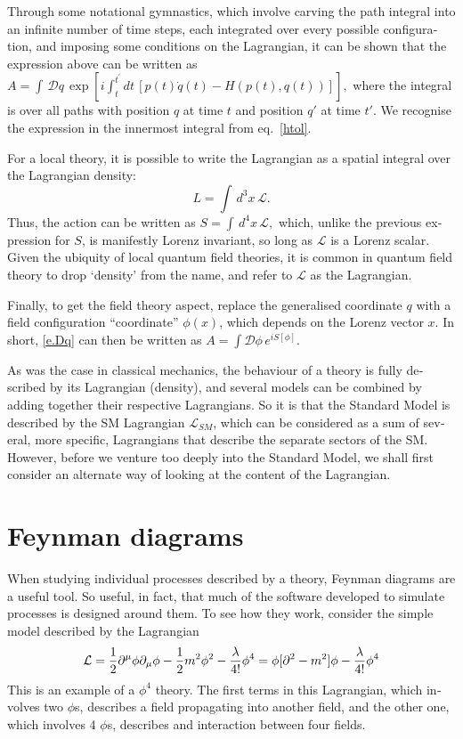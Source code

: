 \begin{english}
Through some notational gymnastics, which involve carving the path integral into an infinite number of time steps, each integrated over every possible configuration, and imposing some conditions on the Lagrangian, it can be shown \cite{sred:tramp} that the expression above can be written as
\(A=\int\,\mathcal Dq\,\exp\left[i\int_t^{t^\prime}dt\,[p(t)\dot q(t)-H(p(t),q(t))]\right],\label{e.Dq}\)
where the integral is over all paths with position $q$ at time $t$ and position $q\prime$ at time $t\prime$. We recognise the expression in the innermost integral from eq.~\eqref{htol}.

For a local theory, it is possible to write the Lagrangian as a spatial integral over the Lagrangian density:
\[L=\int \,d^3x\,\mathcal L.\]
Thus, the action can be written as
\(S=\int\,d^4x\,\mathcal L,\label{e.S}\)
which, unlike the previous expression for $S$, is manifestly Lorenz invariant, so long as $\mathcal L$ is a Lorenz scalar. Given the ubiquity of local quantum field theories, it is common in quantum field theory to drop `density' from the name, and refer to $\mathcal L$ as the Lagrangian.

Finally, to get the field theory aspect, replace the generalised coordinate $q$ with a field configuration ``coordinate'' $\phi(x)$, which depends on the Lorenz vector $x$. In short, \eqref{e.Dq} can then be written as
\(A=\int\mathcal D\phi\, e^{iS[\phi]}.\label{e.Dphi}\)

As was the case in classical mechanics, the behaviour of a theory is fully described by its Lagrangian (density), and several models can be combined by adding together their respective Lagrangians. So it is that the Standard Model is described by the SM Lagrangian $\mathcal L_{SM}$, which can be considered as a sum of several, more specific, Lagrangians that describe the separate sectors of the SM. However, before we venture too deeply into the Standard Model, we shall first consider an alternate way of looking at the content of the Lagrangian.

\section{Feynman diagrams}
When studying individual processes described by a theory, Feynman diagrams are a useful tool. So useful, in fact, that much of the software developed to simulate processes is designed around them. To see how they work, consider the simple model described by the Lagrangian
\[\mathcal L= \frac{1}{2}\partial^\mu\phi\partial_\mu\phi-\frac{1}{2} m^2\phi^2-\frac{\lambda}{4!}\phi^4=\phi[\partial^2-m^2]\phi-\frac{\lambda}{4!}\phi^4\]
This is an example of a $\phi^4$ theory. The first terms in this Lagrangian, which involves two $\phi$s, describes a field propagating into another field, and the other one, which involves 4 $\phi$s, describes and interaction between four fields.


\end{english}

